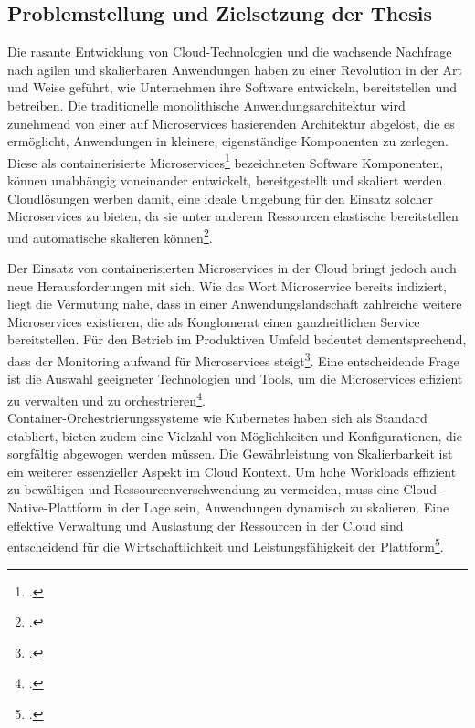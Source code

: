 \subsection{Problemstellung und Zielsetzung der Thesis}
Die rasante Entwicklung von Cloud-Technologien und die wachsende Nachfrage nach agilen und skalierbaren Anwendungen haben zu einer Revolution in der Art und Weise geführt, wie Unternehmen ihre Software entwickeln, bereitstellen und betreiben. Die traditionelle monolithische Anwendungsarchitektur wird zunehmend von einer auf Microservices basierenden Architektur abgelöst, die es ermöglicht, Anwendungen in kleinere, eigenständige Komponenten zu zerlegen. Diese als containerisierte Microservices\footcite[Vgl.][S.4]{wolff2018microservices} bezeichneten Software Komponenten, können unabhängig voneinander entwickelt, bereitgestellt und skaliert werden. Cloudlösungen werben damit, eine ideale Umgebung für den Einsatz solcher Microservices zu bieten, da sie unter anderem Ressourcen elastische bereitstellen und automatische skalieren können\footcite[Vgl.][S.8-19]{henneberger2016cloud}.

Der Einsatz von containerisierten Microservices in der Cloud bringt jedoch auch neue Herausforderungen mit sich. Wie das Wort Microservice bereits indiziert, liegt die Vermutung nahe, dass in einer Anwendungslandschaft zahlreiche weitere Microservices existieren, die als Konglomerat einen ganzheitlichen Service bereitstellen. Für den Betrieb im Produktiven Umfeld bedeutet dementsprechend, dass der Monitoring aufwand für Microservices steigt\footcite[Vgl.][S. 12-13]{wolff2018microservices}. Eine entscheidende Frage ist die Auswahl geeigneter Technologien und Tools, um die Microservices effizient zu verwalten und zu orchestrieren\footcite[Vgl.][S. 16]{wolff2018microservices}. \\
Container-Orchestrierungssysteme wie Kubernetes haben sich als Standard etabliert, bieten zudem eine Vielzahl von Möglichkeiten und Konfigurationen, die sorgfältig abgewogen werden müssen. Die Gewährleistung von Skalierbarkeit ist ein weiterer essenzieller Aspekt im Cloud Kontext.  Um hohe Workloads effizient zu bewältigen und Ressourcenverschwendung zu vermeiden, muss eine Cloud-Native-Plattform in der Lage sein, Anwendungen dynamisch zu skalieren. Eine effektive Verwaltung und Auslastung der Ressourcen in der Cloud sind entscheidend für die Wirtschaftlichkeit und Leistungsfähigkeit der Plattform\footcite[Vgl.][o.S.]{whatisK8s}.


